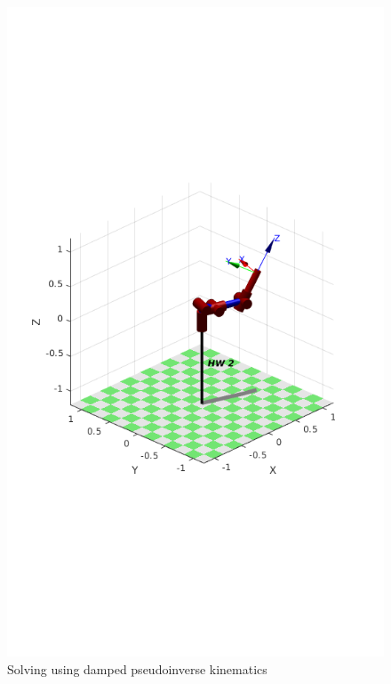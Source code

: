 \documentclass{../homework}
\begin{document}
\begin{solution}
  \begin{figure}[H]
    \centering
    \includegraphics[scale=.3]{3-1inv_LM.png}
    \caption{Solving using damped pseudoinverse kinematics}
  \end{figure}

\end{solution}
\end{document}
